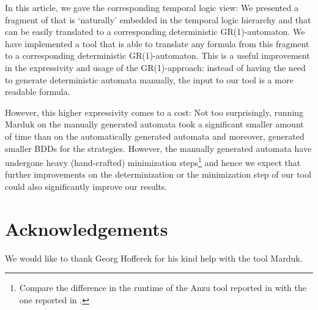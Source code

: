 \documentclass[submission,copyright,creativecommons]{eptcs}
\begin{document}
In this article, we gave the corresponding temporal logic view: We presented a fragment of \LTL{} that is `naturally' embedded in the temporal logic hierarchy and that can be easily translated to a corresponding deterministic GR(1)-automaton. We have implemented a tool that is able to translate any formula from this fragment to a corresponding deterministic GR(1)-automaton. This is a useful improvement in the expressivity and usage of the GR(1)-approach: instead of having the need to generate deterministic automata manually, the input to our tool is a more readable \LTL{} formula.

However, this higher expressivity comes to a cost: Not too surprisingly, running Marduk on the manually generated automata took a significant smaller amount of time than on the automatically generated automata and moreover, generated smaller BDDs for the strategies. However, the manually generated automata have undergone heavy (hand-crafted) minimization steps\footnote{Compare the difference in the runtime of the Anzu tool reported in \cite{BGJP07} with the one reported in \cite{BGJP07a}.} and hence we expect that further improvements on the determinization or the minimization step of our tool could also significantly improve our results.





\section{Acknowledgements}
We would like to thank Georg Hofferek for his kind help with the tool Marduk.

 

\end{document}
